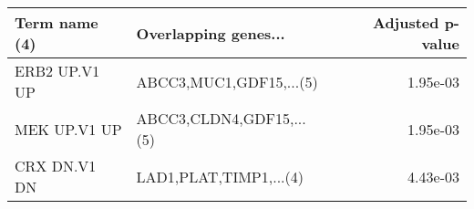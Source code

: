 \begin{tabular}{llr}
\toprule
Term name (4) &     Overlapping genes... &  Adjusted p-value \\
\midrule
ERB2 UP.V1 UP &  ABCC3,MUC1,GDF15,...(5) &          1.95e-03 \\
 MEK UP.V1 UP & ABCC3,CLDN4,GDF15,...(5) &          1.95e-03 \\
 CRX DN.V1 DN &   LAD1,PLAT,TIMP1,...(4) &          4.43e-03 \\
\bottomrule
\end{tabular}
